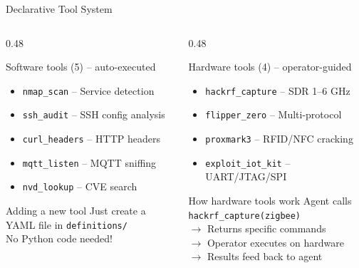 \documentclass[aspectratio=169]{beamer}
\begin{document}
\begin{frame}{Declarative Tool System}

\begin{columns}[T]
\begin{column}{0.48\textwidth}
\begin{block}{Software tools (5) -- auto-executed}
\small
\begin{itemize}
    \item \texttt{nmap\_scan} -- Service detection
    \item \texttt{ssh\_audit} -- SSH config analysis
    \item \texttt{curl\_headers} -- HTTP headers
    \item \texttt{mqtt\_listen} -- MQTT sniffing
    \item \texttt{nvd\_lookup} -- CVE search
\end{itemize}
\end{block}

\vspace{0.2cm}
\begin{alertblock}{Adding a new tool}
\small
Just create a YAML file in \texttt{definitions/}\\
No Python code needed!
\end{alertblock}
\end{column}

\begin{column}{0.48\textwidth}
\begin{block}{Hardware tools (4) -- operator-guided}
\small
\begin{itemize}
    \item \texttt{hackrf\_capture} -- SDR 1--6 GHz
    \item \texttt{flipper\_zero} -- Multi-protocol
    \item \texttt{proxmark3} -- RFID/NFC cracking
    \item \texttt{exploit\_iot\_kit} -- UART/JTAG/SPI
\end{itemize}
\end{block}

\vspace{0.2cm}
\begin{exampleblock}{How hardware tools work}
\small
Agent calls \texttt{hackrf\_capture(zigbee)}\\
$\rightarrow$ Returns specific commands\\
$\rightarrow$ Operator executes on hardware\\
$\rightarrow$ Results feed back to agent
\end{exampleblock}
\end{column}
\end{columns}
\end{frame}
\end{document}
